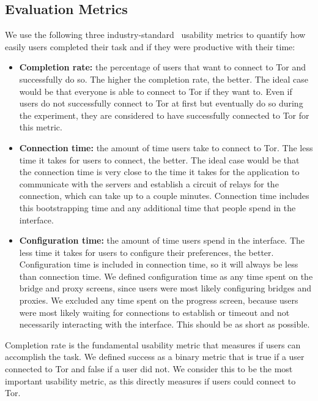 \documentclass[USenglish,oneside,twocolumn]{article}
\begin{document}
\subsection{Evaluation Metrics}
\label{sec:eval}
We use the following three industry-standard~\cite{albert2013measuring} usability metrics to quantify how easily users completed their task and if they were productive with their time: \\

\begin{itemize}
\item {\bfseries Completion rate:}  the percentage of users that want to connect to Tor and successfully do so. The higher the completion rate, the better. The ideal case would be that everyone is able to connect to Tor if they want to. Even if users do not successfully connect to Tor at first but eventually do so during the experiment, they are considered to have successfully connected to Tor for this metric.
\item {\bfseries Connection time:} the amount of time users take to connect to Tor. The less time it takes for users to connect, the better. The ideal case would be that the connection time is very close to the time it takes for the application to communicate with the servers and establish a circuit of relays for the connection, which can take up to a couple minutes. Connection time includes this bootstrapping time and any additional time that people spend in the interface. 
\item {\bfseries Configuration time:} the amount of time users spend in the interface. The less time it takes for users to configure their preferences, the better. Configuration time is included in connection time, so it will always be less than connection time. We defined configuration time as any time spent on the bridge and proxy screens, since users were most likely configuring bridges and proxies. We excluded any time spent on the progress screen, because users were most likely waiting for connections to establish or timeout and not necessarily interacting with the interface. This should be as short as possible.
\end{itemize}

Completion rate is the fundamental usability metric that measures if users can accomplish the task. We defined success as a binary metric that is true if a user connected to Tor and false if a user did not. We consider this to be the most important usability metric, as this directly measures if users could connect to Tor. 
\end{document}
